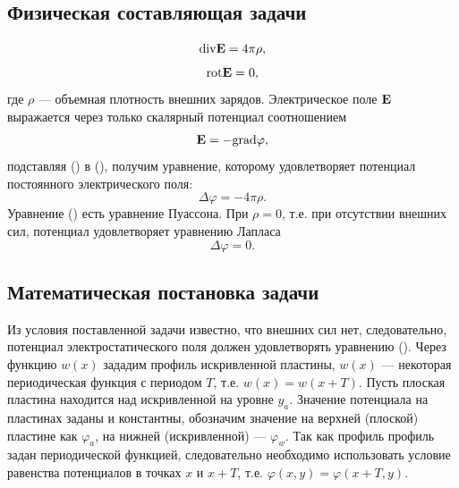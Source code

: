 \documentclass[12pt, a4paper]{article}
\renewcommand{\vec}[1]{\text{\mathversion{bold}${#1}$}}%
\renewcommand{\phi}{\varphi}
\begin{document}
		\subsection{Физическая составляющая задачи}
			\begin{equation}
				\mathrm{div} \vec{\mathrm{E}} = 4 \pi \rho,
				\label{div_E}
			\end{equation}
			\begin{equation}
				\mathrm{rot} \vec{\mathrm{E}} = 0,
				\label{rot_E}
			\end{equation}
			где $\rho$ --- объемная плотность внешних зарядов. Электрическое поле $\vec{\mathrm{E}}$ выражается через только скалярный потенциал соотношением
			\begin{equation}
				\vec{\mathrm{E}} = -\mathrm{grad} \varphi,
				\label{E_grad_phi}
			\end{equation}
			подставляя () в (), получим уравнение, которому удовлетворяет потенциал постоянного электрического поля:
			\begin{equation}
				\Delta \varphi = - 4 \pi \rho.
				\label{Pois_eq}
			\end{equation}
			Уравнение () есть уравнение Пуассона. При $\rho = 0$, т.е. при отсутствии внешних сил, потенциал удовлетворяет уравнению Лапласа \cite{Landau}
			\begin{equation}
				\Delta \phi = 0.
				\label{Laplace_eq}
			\end{equation}
			
		\subsection{Математическая постановка задачи}
			
			Из условия поставленной задачи известно, что внешних сил нет, следовательно, потенциал электростатического поля должен удовлетворять уравнению (). Через функцию $w(x)$ зададим профиль искривленной пластины, $w(x)$  --- некоторая периодическая функция с периодом $T$, т.е. $w(x) = w(x + T)$. Пусть плоская пластина находится над искривленной на уровне $y_a$. Значение потенциала на пластинах заданы и константны, обозначим значение на верхней (плоской) пластине как $\phi_a$, на нижней (искривленной) --- $\phi_w$. Так как профиль профиль задан периодической функцией, следовательно необходимо использовать условие равенства потенциалов в точках $x$ и $x + T$, т.е. $\phi (x, y) = \phi (x + T, y)$.
			
\end{document}
